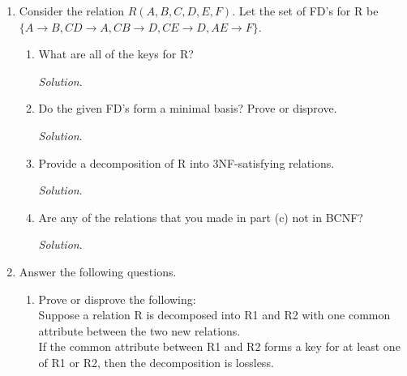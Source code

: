 \documentclass[10pt]{article}
\begin{document}
\begin{enumerate}
    \item Consider the relation $R(A, B, C, D, E, F)$.
    Let the set of FD’s for R be $\{A \rightarrow B,CD \rightarrow A,CB \rightarrow D,CE \rightarrow D,AE \rightarrow F\}$.
    \begin{enumerate}
        \item What are all of the keys for R?
        
        \begin{mdframed}[leftmargin=-6.5mm]
        \textit{Solution}.\\
        \end{mdframed}
        
        \item Do the given FD’s form a minimal basis? Prove or disprove.
        
        \begin{mdframed}[leftmargin=-6.5mm]
        \textit{Solution}.\\
        \end{mdframed}
        
        \item Provide a decomposition of R into 3NF-satisfying relations.
        
        \begin{mdframed}[leftmargin=-6.5mm]
        \textit{Solution}.\\
        \end{mdframed}
        
        \item Are any of the relations that you made in part (c) not in BCNF?
        
        \begin{mdframed}[leftmargin=-6.5mm]
        \textit{Solution}.\\
        \end{mdframed}
        
    \end{enumerate}
    
    \item Answer the following questions.
    \begin{enumerate}
        \item Prove or disprove the following:\\
              Suppose a relation R is decomposed into R1 and R2 with one common attribute between the two new relations.\\
              If the common attribute between R1 and R2 forms a key for at least one of R1 or R2, then the decomposition is lossless.
              

\end{enumerate}
\end{enumerate}
\end{document}

